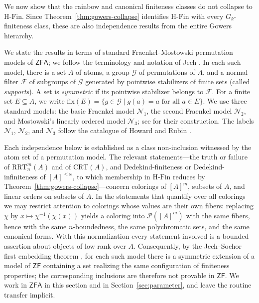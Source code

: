 \documentclass[10pt,a4paper]{amsart}
\theoremstyle{definition}
\newcommand{\ZF}{\mathsf{ZF}}
\newcommand{\ZFA}{\mathsf{ZFA}}
\newcommand{\HFin}{\mathrm{H\text{-}Fin}}
\newcommand{\RRT}{\mathrm{RRT}}
\newcommand{\CRT}{\mathrm{CRT}}
\newcommand{\NN}{\mathcal{N}}
\begin{document}
We now show that the rainbow and canonical finiteness classes do not collapse to \(\HFin\).  Since Theorem~\ref{thm:gowers-collapse} identifies \(\HFin\) with every \(G_k\)-finiteness class, these are also independence results from the entire Gowers hierarchy.

We state the results in terms of standard Fraenkel--Mostowski permutation models of \(\ZFA\); we follow the terminology and notation of Jech \cite[Chapter~4]{JechAC}.  In each such model, there is a set \(A\) of atoms, a group \(\mathcal G\) of permutations of \(A\), and a normal filter \(\mathcal F\) of subgroups of \(\mathcal G\) generated by pointwise stabilizers of finite sets (called \emph{supports}).  A set is \emph{symmetric} if its pointwise stabilizer belongs to \(\mathcal F\).  For a finite set \(E\subseteq A\), we write \(\mathrm{fix}(E)=\{g\in\mathcal G\mid g(a)=a\text{ for all }a\in E\}\).  We use three standard models: the basic Fraenkel model \(\NN_1\), the second Fraenkel model \(\NN_2\), and Mostowski's linearly ordered model \(\NN_3\); see \cite[Chapter~4]{JechAC} for their construction.  The labels \(\NN_1\), \(\NN_2\), and \(\NN_3\) follow the catalogue of Howard and Rubin \cite{HowardRubin}.

Each independence below is established as a class non-inclusion witnessed by the atom set of a permutation model.  The relevant statements---the truth or failure of \(\RRT^m_n(A)\) and of \(\CRT(A)\), and Dedekind-finiteness or Dedekind-infiniteness of \([A]^{<\omega}\), to which membership in \(\HFin\) reduces by Theorem~\ref{thm:gowers-collapse}---concern colorings of \([A]^m\), subsets of \(A\), and linear orders on subsets of \(A\).  In the statements that quantify over all colorings we may restrict attention to colorings whose values are their own fibers: replacing \(\chi\) by \(x\mapsto\chi^{-1}(\chi(x))\) yields a coloring into \(\mathcal P([A]^m)\) with the same fibers, hence with the same \(n\)-boundedness, the same polychromatic sets, and the same canonical forms.  With this normalization every statement involved is a bounded assertion about objects of low rank over \(A\).  Consequently, by the Jech--Sochor first embedding theorem \cite[Theorem~6.1]{JechAC}, for each such model there is a symmetric extension of a model of \(\ZF\) containing a set realizing the same configuration of finiteness properties; the corresponding inclusions are therefore not provable in \(\ZF\).  We work in \(\ZFA\) in this section and in Section~\ref{sec:parameter}, and leave the routine transfer implicit.
\end{document}
